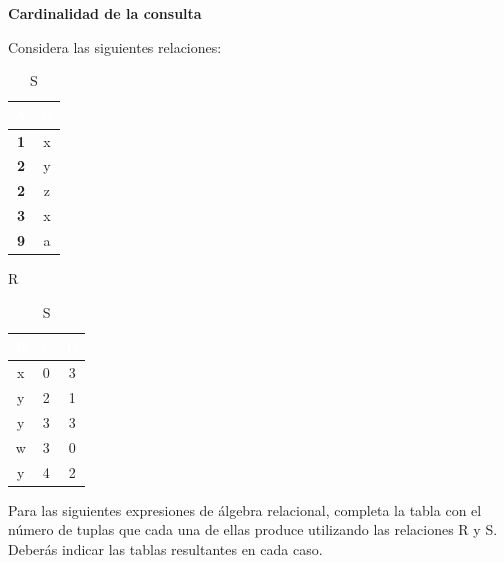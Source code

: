 \begin{center}
    \textbf{\textbf{Cardinalidad de la consulta}}
\end{center}

Considera las siguientes relaciones:
\begin{table}[H]
    \centering
    \setlength{\tabcolsep}{10pt} %
    \begin{minipage}{0.4\textwidth}
        \centering
        \begin{tabular}{|c|c|}
        \hline
        \rowcolor{blue!50}
        \textcolor{white}{\textbf{A}} & \textcolor{white}{\textbf{B}} \\ \hline
        \textbf{1} & x \\ \hline
        \textbf{2} & y \\ \hline
        \textbf{2} & z \\ \hline
        \textbf{3} & x \\ \hline
        \textbf{9} & a \\ \hline
        \end{tabular}
        \caption{R}
    \end{minipage}
    \hspace{2cm} %
    \begin{minipage}{0.4\textwidth}
        \centering
        \begin{tabular}{|c|c|c|}
        \hline
        \rowcolor{blue!50}
        \textcolor{white}{\textbf{B}} & \textcolor{white}{\textbf{C}} & \textcolor{white}{\textbf{D}} \\ \hline
        x & 0 & 3 \\ \hline
        y & 2 & 1 \\ \hline
        y & 3 & 3 \\ \hline
        w & 3 & 0 \\ \hline
        y & 4 & 2 \\ \hline
        \end{tabular}
        \caption{S}
    \end{minipage}
\end{table}

Para las siguientes expresiones de álgebra relacional, completa la tabla con el número de tuplas que cada una de ellas
produce utilizando las relaciones R y S. Deberás indicar las tablas resultantes en cada caso.


